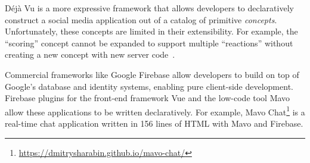 

Déjà Vu is a more expressive framework that allows developers
to declaratively construct a social media application out
of a catalog of primitive \emph{concepts}.
Unfortunately, these concepts are limited in their extensibility.
For example, the ``scoring'' concept cannot be expanded
to support multiple ``reactions''
without creating a new concept with new server code~\cite{dejavu}.

Commercial frameworks like Google Firebase allow developers
to build on top of Google's database and identity systems,
enabling pure client-side development.
Firebase plugins for the front-end framework Vue and the low-code tool
Mavo~\cite{mavo} allow these applications to be written declaratively.
For example, Mavo Chat\footnote{
    \url{https://dmitrysharabin.github.io/mavo-chat/}
} is a real-time chat application written in 156 lines of HTML
with Mavo and Firebase.


